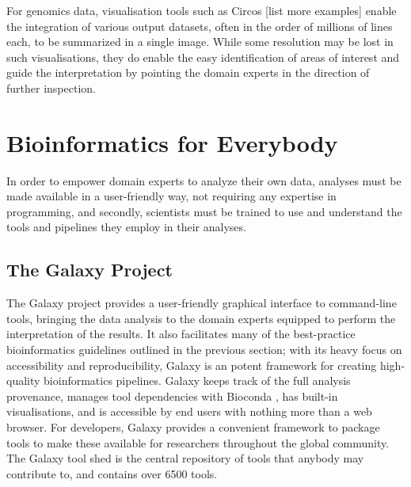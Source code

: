 \begin{justify}
For genomics data, visualisation tools such as Circos \cite{circos} [list more examples] enable the integration of various output datasets, often in the order of millions of lines each, to be summarized in a single image. While some resolution may be lost in such visualisations, they do enable the easy identification of areas of interest and guide the interpretation by pointing the domain experts in the direction of further inspection.


\section{Bioinformatics for Everybody}

In order to empower domain experts to analyze their own data, analyses must be made available in a user-friendly way, not requiring any expertise in programming, and secondly, scientists must be trained to use and understand the tools and pipelines they employ in their analyses.

\subsection{The Galaxy Project}
The Galaxy project \cite{afgan2016galaxy} provides a user-friendly graphical interface to command-line tools, bringing the data analysis to the domain experts equipped to perform the interpretation of the results. It also facilitates many of the best-practice bioinformatics guidelines outlined in the previous section; with its heavy focus on accessibility and reproducibility, Galaxy is an potent framework for creating high-quality bioinformatics pipelines. Galaxy keeps track of the full analysis provenance, manages tool dependencies with Bioconda \cite{gruning2017bioconda}, has built-in visualisations, and is accessible by end users with nothing more than a web browser. For developers, Galaxy provides a convenient framework to package tools to make these available for researchers throughout the global community. The Galaxy tool shed \cite{url-toolshed} is the central repository of tools that anybody may contribute to, and contains over 6500 tools.


\end{justify}
